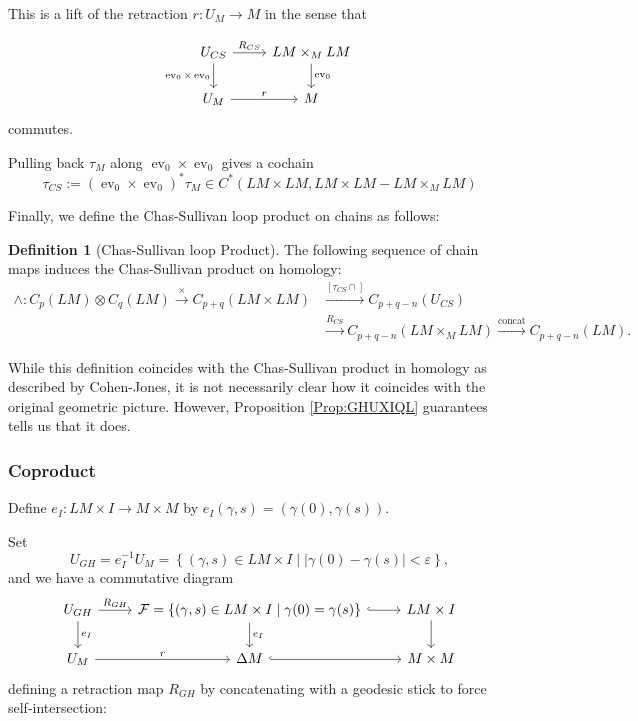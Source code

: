 \documentclass[reqno]{amsart}
\theoremstyle{definition}
\newtheorem{definition}[theorem]{Definition}
\theoremstyle{remark}
\DeclareMathOperator{\ev}{ev}
\begin{document}
 This is a lift of the retraction $r \colon U_M \to M$ in the sense that

 \begin{equation*}
 \begin{tikzcd}
     U_{CS} \ar[d, "\ev_0 \times \ev_0"'] \ar[r, "R_{CS}"] & 
     LM \times_M LM \ar[d, "\ev_0"] \\
     U_M \ar[r, "r"] & M
 \end{tikzcd}
 \end{equation*}
 commutes.
 
 Pulling back $\tau_M$ along $\ev_0 \times \ev_0$ gives a cochain
 \[
 \tau_{CS} := \left( \ev_0 \times \ev_0 \right)^{*} \tau_M
 \in C^{*} \left( LM \times LM, LM \times LM - LM \times_M LM \right) 
 \] 
 
 Finally, we define the Chas-Sullivan loop product on chains as
 follows:

 \begin{definition}[Chas-Sullivan loop Product]
     The following sequence of chain maps induces the Chas-Sullivan
     product on homology:
     \begin{align*}
         \wedge \colon C_p (LM) \otimes C_{q} (LM) 
         \stackrel{\times }{\to} C_{p+q}(LM \times LM) 
         &\stackrel{\left[ \tau_{CS} \cap \right] }{\to} 
         C_{p+q-n}(U_{CS}) \\
         &\stackrel{R_{CS}}{\to} C_{p+q-n}\left( LM \times_M LM \right) 
         \stackrel{\text{concat}}{\to} C_{p+q-n}(LM).
     \end{align*}
 \end{definition}


 While this definition coincides with the Chas-Sullivan product
 in homology as described by
 Cohen-Jones, it is not necessarily clear how it coincides with the
 original geometric picture.
 However, Proposition \ref{Prop:GHUXIQL} guarantees tells us that it does.



 \subsubsection{Coproduct}
 
 Define
 $e_I \colon LM \times I \to M \times M$ by
 $e_I\left( \gamma, s \right) = \left( \gamma(0) , \gamma(s) \right) $.

 Set 
 \[
 U_{GH} = e_{I}^{-1} U_M = 
 \left\{ \left( \gamma, s \right) \in LM \times I  \mid 
 \left| \gamma(0) - \gamma(s) \right| < \varepsilon \right\} , 
 \] 
 and we have a commutative diagram
 \begin{equation*}
 \begin{tikzcd}
     U_{GH} \ar[r, "R_{GH}"] \ar[d, "e_I"] & 
     \mathcal{F} = \left\{ \left( \gamma, s \right) \in LM \times I  \mid 
 \gamma(0) = \gamma(s) \right\} \ar[r, hookrightarrow] 
 \ar[d, "e_I"] & LM \times I 
 \ar[d] \\
 U_M \ar[r, "r"] & \Delta M \ar[r, hookrightarrow] & 
 M \times M
 \end{tikzcd}
 \end{equation*}
 defining a retraction map
 $R_{GH}$ by concatenating with a geodesic stick to force self-intersection:
\end{document}
